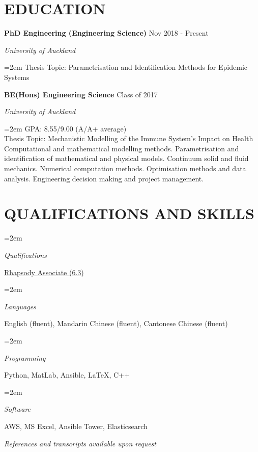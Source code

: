 \documentclass[paper=a4paper,fontsize=11pt]{scrartcl} %
\newlength{\spacebox}
\newcommand{\NewPart}[1]{\section*{\uppercase{#1}}}
\newcommand{\PersonalEntry}[2]{
		\noindent\hangindent=2em\hangafter=0 %
		\parbox{\spacebox}{        %
		\textit{#1}}		       %
		\hspace{1.5em} #2 \par}    %
\newcommand{\SkillsEntry}[2]{      %
		\noindent\hangindent=2em\hangafter=0 %
		\parbox{\spacebox}{        %
		\textit{#1}}			   %
		\hspace{1.5em} #2 \par}    %
\newcommand{\EducationEntry}[4]{
		\noindent \textbf{#1} \hfill      %
		{#2} \par  %
		\noindent \textit{#3} \par        %
		\noindent\hangindent=2em\hangafter=0 \small #4 %
		\normalsize \par}
\newcommand{\ProjectEntry}[3]{
        \noindent \parbox{\spacebox}{\textbf{#1}} %
        \parbox{\spacebox}{#2}                    %
        #3 \par}                                  %
\begin{document}
\NewPart{Education}

\EducationEntry{PhD Engineering (Engineering Science)}{Nov 2018 - Present}{University of Auckland}{Thesis Topic: Parametrisation and Identification Methods for Epidemic Systems}

\EducationEntry{BE(Hons) Engineering Science}{Class of 2017}{University of Auckland}{GPA: 8.55/9.00 (A/A+ average)\\ Thesis Topic: Mechanistic Modelling of the Immune System's Impact on Health \\ Computational and mathematical modelling methods. Parametrisation and identification of mathematical and physical models. Continuum solid and fluid mechanics. Numerical computation methods. Optimisation methods and data analysis. Engineering decision making and project management.}


\NewPart{Qualifications and Skills}

\SkillsEntry{Qualifications}{\href{https://rhapsody.health/education/}{Rhapsody Associate (6.3)}}

\SkillsEntry{Languages}{English (fluent), Mandarin Chinese (fluent), Cantonese Chinese (fluent)}

\SkillsEntry{Programming}{Python, MatLab, Ansible, \LaTeX, C++}

\SkillsEntry{Software}{AWS, MS Excel, Ansible Tower, Elasticsearch}%




\vspace{1ex} \titlerule[2pt] \vspace{1ex}
\textit{References and transcripts available upon request}
\end{document}
